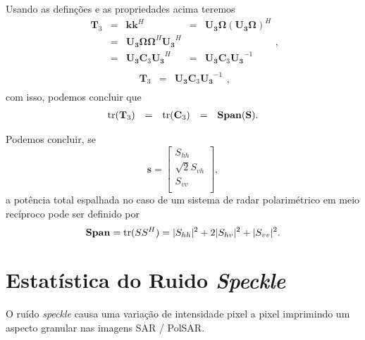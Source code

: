 Usando as definções e as propriedades acima teremos
\begin{equation}\nonumber
\begin{array}{rrrrr}
	\mathbf{T}_3&=&\mathbf{k}\mathbf{k}^H&=&\mathbf{U_3\Omega}(\mathbf{U_3\Omega})^H	\\
	   &=&\mathbf{U_3\Omega}\mathbf{\Omega}^H\mathbf{U_3}^H&&	\\
	   &=&\mathbf{U_3}\mathbf{C}_3\mathbf{U_3}^H&=&\mathbf{U_3}\mathbf{C}_3\mathbf{U_3}^{-1}\\
\end{array},
\end{equation}
\begin{equation}\label{matriz_simil_t3_c3}
\begin{array}{rrr}
	 \mathbf{T}_3  &=&\mathbf{U_3}\mathbf{C}_3\mathbf{U_3}^{-1}\\
\end{array},
\end{equation}
com isso, podemos concluir que
\begin{equation}\label{traco_t3_c3}
\begin{array}{rrrrr}
	\operatorname{tr}({\mathbf{T}_3})  &=&\operatorname{tr}({\mathbf{C}_3})&=&\mathbf{Span(S)}.\\
\end{array}
\end{equation}

Podemos concluir, se
\begin{equation}\label{vetor_3d} 
\mathbf{s} = \left[
\begin{array}{c}
	S_{hh}      \\
        \sqrt{2}S_{vh}     \\
	S_{vv}      \\
\end{array}
\right],
\end{equation}
a potência total espalhada no caso de um sistema de radar polarimétrico em meio recíproco pode ser definido por
\begin{equation}\label{span_geral}
\mathbf{Span} = \operatorname{tr}(SS^H)=|S_{hh}|^2+2|S_{hv}|^2+|S_{vv}|^2.
\end{equation}

\section{Estatística do Ruido \textit{Speckle}}
O ruído \textit{speckle} causa uma variação de intensidade pixel a pixel imprimindo um aspecto granular nas imagens SAR / PolSAR.  

